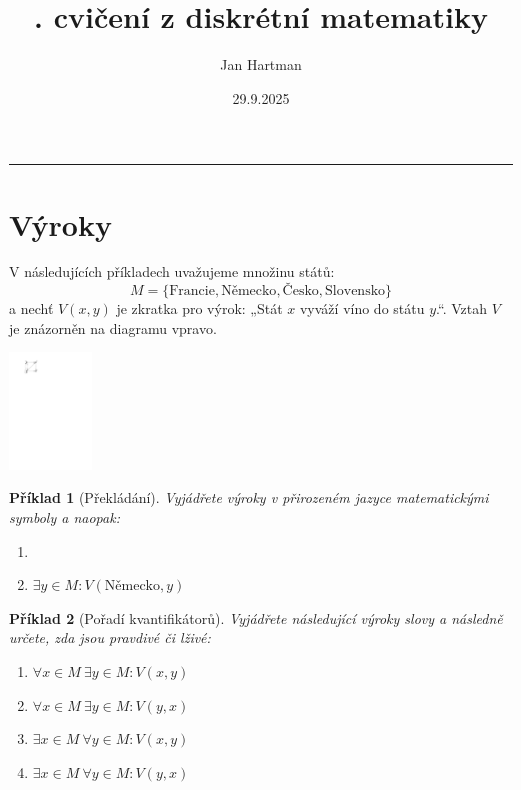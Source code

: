 \documentclass[10pt]{article}
\title{\tutnum. cvičení z diskrétní matematiky}
\author{Jan Hartman}
\date{29.9.2025}
\newcommand{\titlerule}{%
    \noindent %
    \makebox[\textwidth]{\large \thetitle \hfill \thedate}
    \rule{\textwidth}{0.4pt}%
}
\theoremstyle{definitionstyle}
\theoremstyle{problemstyle}
\newtheorem{problem}{Příklad}
\begin{document}
\titlerule

\section{Výroky}

\begin{minipage}{0.7\textwidth}
V následujících příkladech uvažujeme množinu států: $$M = \{ \text{Francie}, \text{Německo}, \text{Česko}, \text{Slovensko} \}$$ a nechť $V(x,y)$ je zkratka pro výrok: „Stát $x$ vyváží víno do státu $y$.“. Vztah $V$ je znázorněn na diagramu vpravo.
\end{minipage}%
\hfill
\begin{minipage}{0.15\textwidth}
  \centering
  \includegraphics[width=2.2cm]{states.pdf}
\end{minipage}

\begin{problem}[Překládání]
Vyjádřete výroky v přirozeném jazyce matematickými symboly a naopak:
\begin{enumerate}[label=(\alph*)]
    \item {}
    \item $\exists y \in M : V(\text{Německo},y)$
\end{enumerate}
\end{problem}

\begin{problem}[Pořadí kvantifikátorů]
Vyjádřete následující výroky slovy a následně určete, zda jsou pravdivé či lživé:
\begin{enumerate}[label=(\alph*)]
    \item $\forall x \in M \ \exists y \in M : V(x,y)$
    \item $\forall x \in M \ \exists y \in M : V(y,x)$
    \item $\exists x \in M \ \forall y \in M : V(x,y)$
    \item $\exists x \in M \ \forall y \in M : V(y,x)$
\end{enumerate}

\end{problem}
\end{document}
